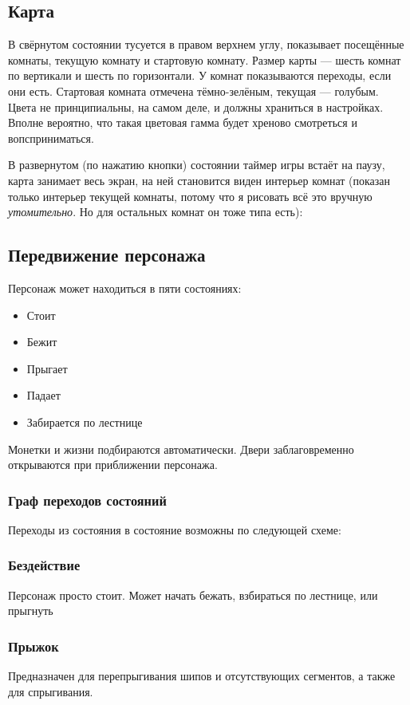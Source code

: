 \documentclass[12pt,a4paper]{article}
\begin{document}
\subsection{Карта}
В свёрнутом состоянии тусуется в правом верхнем углу, показывает посещённые комнаты, текущую комнату и стартовую комнату. Размер карты --- шесть комнат по вертикали и шесть по горизонтали. У комнат показываются переходы, если они есть. Стартовая комната отмечена тёмно-зелёным, текущая --- голубым. Цвета не принципиальны, на самом деле, и должны храниться в настройках. Вполне вероятно, что такая цветовая гамма будет хреново смотреться и вопсприниматься.\\

В развернутом (по нажатию кнопки) состоянии таймер игры встаёт на паузу, карта занимает весь экран, на ней становится виден интерьер комнат (показан только интерьер текущей комнаты, потому что я рисовать всё это вручную \textit{утомительно}. Но для остальных комнат он тоже типа есть):\\

\subsection{Передвижение персонажа}
Персонаж может находиться в пяти состояниях:
\begin{itemize}
\item Стоит
\item Бежит
\item Прыгает
\item Падает
\item Забирается по лестнице
\end{itemize}
Монетки и жизни подбираются автоматически. Двери заблаговременно открываются при приближении персонажа.
\subsubsection{Граф переходов состояний}
Переходы из состояния в состояние возможны по следующей схеме:\\

\subsubsection{Бездействие}
Персонаж просто стоит. Может начать бежать, взбираться по лестнице, или прыгнуть
\subsubsection{Прыжок}
Предназначен для перепрыгивания шипов и отсутствующих сегментов, а также для спрыгивания.
\end{document}
